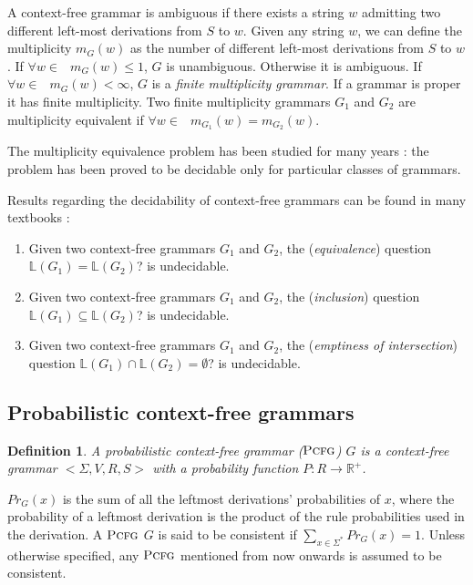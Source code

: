 \documentclass[submission]{eptcs} \usepackage{breakurl}             \usepackage[english]{babel}
\newtheorem{definition}{Definition}
\providecommand{\R}{\ensuremath{{\mathds R}}}
\providecommand{\PCFG}{\ensuremath{\textsc{Pcfg}}}
\providecommand{\Naming}{\ensuremath{\mathbb L}}
\providecommand{\Prob}{\ensuremath{Pr}}
\providecommand{\Sigmastar}{\ensuremath{\mathop{\Sigma^{\star}}}}
\begin{document}
A context-free grammar is ambiguous if there exists a string $w$ admitting two different left-most derivations from $S$ to $w$. Given any string $w$, we can define the multiplicity $m_G(w)$ as the number of different left-most derivations from $S$ to $w$. If $\forall w\in\Sigmastar\, m_G(w)\le 1$, $G$ is unambiguous. Otherwise it is ambiguous. If $\forall w\in\Sigmastar\, m_G(w)< \infty$, $G$ is a \emph{finite multiplicity grammar}. If a grammar is proper it has finite multiplicity. Two finite multiplicity grammars $G_1$ and $G_2$ are multiplicity equivalent if $\forall w\in\Sigmastar\, m_{G_1}(w)=m_{G_2}(w)$.

The multiplicity equivalence problem has been studied for many years \cite{kuic86}: the problem has been proved to be decidable only for particular classes of grammars.


Results regarding the decidability of context-free grammars can be found in many textbooks \cite{harr78}:
\begin{enumerate}
\item  Given two context-free grammars $G_1$ and $G_2$, the (\emph{equivalence}) question $\Naming(G_1)=\Naming(G_2)$? is undecidable.
\item  Given two context-free grammars $G_1$ and $G_2$, the (\emph{inclusion}) question $\Naming(G_1)\subseteq \Naming(G_2)$? is undecidable.
\item  Given two context-free grammars $G_1$ and $G_2$, the (\emph{emptiness of intersection}) question $\Naming(G_1)\cap \Naming(G_2)=\emptyset$? is undecidable.
\end{enumerate}

\subsection{Probabilistic context-free grammars}

\begin{definition}
  A \emph{probabilistic context-free grammar ($\PCFG$)} $G$
  is a context-free grammar $<\Sigma,V, R, S>$  with a probability function 
  $P:R\to\R^+$.
\end{definition}


$\Prob_{G}(x)$ is the sum of all the leftmost derivations’ probabilities of $x$, where the probability of a leftmost derivation is the product of the rule probabilities used in the derivation. A $\PCFG$ $G$ is said to be consistent if $\sum_{x\in \Sigma^*} \Prob_{G}(x) = 1$. Unless otherwise specified, any $\PCFG$ mentioned from now onwards is assumed to be consistent. 
\end{document}
